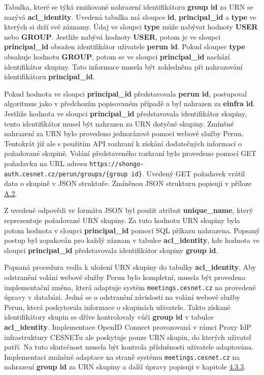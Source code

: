 \documentclass[
  printed, %
  twoside, %
  table,   %
  nolof,     %
  nolot,     %
]{fithesis3}
\begin{document}
\par 

Tabulka, které se týká zmiňované nahrazení identifikátoru \textbf{group id} za URN se nazývá \textbf{acl\_identity}. Uvedená tabulka má sloupce \textbf{id}, \textbf{principal\_id} a \textbf{type} ve kterých si drží své záznamy. Údaj ve sloupci \textbf{type} může nabývat hodnoty \textbf{USER} nebo \textbf{GROUP}. Jestliže nabývá hodnoty \textbf{USER}, potom je ve sloupci \textbf{principal\_id} obsažen identifikátor uživatele \textbf{perun id}. Pokud sloupec \textbf{type} obsahuje hodnotu \textbf{GROUP}, potom se ve sloupci \textbf{principal\_id} nachází identifikátor skupiny. Tato informace musela být zohledněna při nahrazování identifikátoru \textbf{principal\_id}. 

\par 
Pokud hodnota ve sloupci \textbf{principal\_id} představovala \textbf{perun id}, postupoval algoritmus jako v předchozím popisovaném případě a byl nahrazen za \textbf{einfra id}. Jestliže hodnota ve sloupci \textbf{principal\_id} představovala identifikátor skupiny, tento identifikátor musel být nahrazen za URN  dotyčné skupiny. Zmíněné nahrazení za URN bylo provedeno jednorázově pomocí webové služby Perun. Tentokrát již ale s použitím API rozhraní k získání dodatečných informací o požadované skupině. Volání představeného rozhraní bylo provedeno pomocí GET požadavku na URL adresu  \texttt{https://shongo-auth.cesnet.cz/perun/groups/\{group id\}}. Uvedený GET požadavek vrátil data o skupině v JSON struktuře. Zmíněnou JSON strukturu popisuji v příloze \hyperref[table:perunws:group]{A.2}.
\par
Z uvedené odpovědi ve formátu JSON byl použit atribut \textbf{unique\_name}, který reprezentuje požadované URN skupiny. Za tuto hodnotu URN skupiny byla potom hodnota v sloupci \textbf{principal\_id} pomocí SQL příkazu nahrazena. Popsaný postup byl zopakován pro každý záznam v tabulce \textbf{acl\_identity}, kde hodnota ve sloupci \textbf{principal\_id} představovala identifikátor skupiny \textbf{group id}. 
\par 

Popsaná procedura vedla k uložení URN skupiny do tabulky \textbf{acl\_identity}. Aby odstranění volání webové služby Perun bylo kompletní, musela být provedena implementační změna, která adaptuje systém \texttt{meetings.cesnet.cz} na provedené úpravy v databázi. Jedná se o odstranění závislosti na volání webové služby Perun, která poskytovala informace o skupinách uživatele. Takto získané identifikátory skupin se dříve kontrolovaly vůči \textbf{group id} v tabulce \textbf{acl\_identity}. Implementace OpenID Connect provozovaná v rámci Proxy IdP infrastruktury CESNETu ale poskytuje pouze URN skupin, do kterých uživatel patří. Na tuto skutečnost musela být kontrola příslušnosti uživatele adaptována. Implementaci zmíněné adaptace na straně systému \texttt{meetings.cesnet.cz} na nahrazení \textbf{group id} za URN skupiny a další úpravy popisuji v kapitole \hyperref[ShongoImpl-web]{4.3.3}. 
\end{document}
